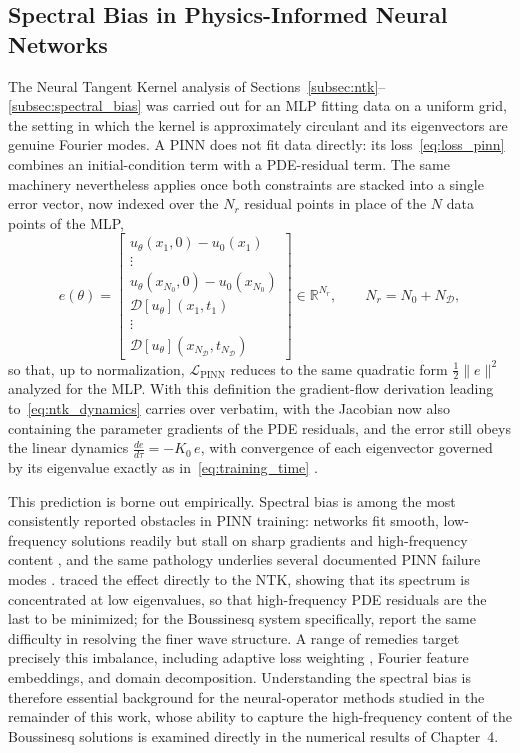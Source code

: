 \subsection{Spectral Bias in Physics-Informed Neural Networks}
\label{subsec:ntk_pinn}

The Neural Tangent Kernel analysis of Sections~\ref{subsec:ntk}--\ref{subsec:spectral_bias} was carried out for an MLP fitting data on a uniform grid, the setting in which the kernel is approximately circulant and its eigenvectors are genuine Fourier modes. A PINN does not fit data directly: its loss~\eqref{eq:loss_pinn} combines an initial-condition term with a PDE-residual term. The same machinery nevertheless applies once both constraints are stacked into a single error vector, now indexed over the $N_r$ residual points in place of the $N$ data points of the MLP,
\begin{equation}\label{eq:pinn_error_vector}
    e(\theta) =
    \begin{bmatrix}
        u_\theta(x_1,0) - u_0(x_1) \\ \vdots \\ u_\theta(x_{N_0},0) - u_0(x_{N_0}) \\[3pt]
        \mathcal{D}[u_\theta](x_1,t_1) \\ \vdots \\ \mathcal{D}[u_\theta](x_{N_\mathcal{D}},t_{N_\mathcal{D}})
    \end{bmatrix}
    \in \mathbb{R}^{N_r}, \qquad N_r = N_0 + N_\mathcal{D},
\end{equation}
so that, up to normalization, $\mathcal{L}_{\text{PINN}}$ reduces to the same quadratic form $\tfrac{1}{2}\|e\|^2$ analyzed for the MLP. With this definition the gradient-flow derivation leading to~\eqref{eq:ntk_dynamics} carries over verbatim, with the Jacobian now also containing the parameter gradients of the PDE residuals, and the error still obeys the linear dynamics $\frac{de}{d\tau} = -K_0\,e$, with convergence of each eigenvector governed by its eigenvalue exactly as in~\eqref{eq:training_time} \parencite{wang2022ntk}.

This prediction is borne out empirically. Spectral bias is among the most consistently reported obstacles in PINN training: networks fit smooth, low-frequency solutions readily but stall on sharp gradients and high-frequency content \parencite{rahaman2019, xu2019frequency, wang2021understanding}, and the same pathology underlies several documented PINN failure modes \parencite{krishnapriyan2021characterizing}. \textcite{wang2022ntk} traced the effect directly to the NTK, showing that its spectrum is concentrated at low eigenvalues, so that high-frequency PDE residuals are the last to be minimized; for the Boussinesq system specifically, \textcite{wang2024} report the same difficulty in resolving the finer wave structure. A range of remedies target precisely this imbalance, including adaptive loss weighting \parencite{wang2021understanding}, Fourier feature embeddings, and domain decomposition. Understanding the spectral bias is therefore essential background for the neural-operator methods studied in the remainder of this work, whose ability to capture the high-frequency content of the Boussinesq solutions is examined directly in the numerical results of Chapter~4.

